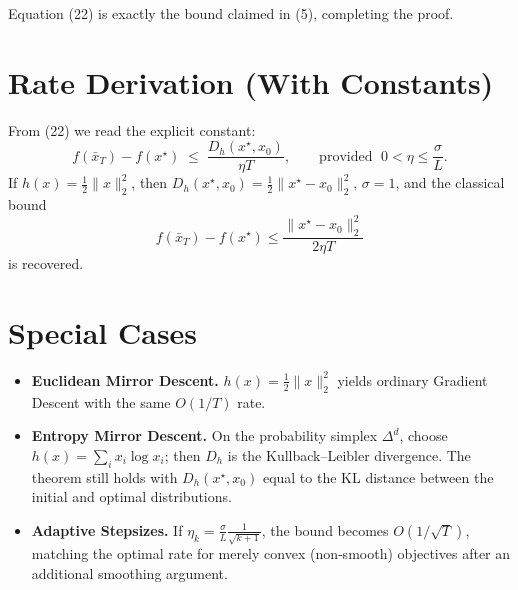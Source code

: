 \documentclass{article}
\begin{document}
Equation (22) is exactly the bound claimed in (5), completing the proof. \hfill\qedsymbol

\section*{Rate Derivation (With Constants)}
From (22) we read the explicit constant:
\[
\boxed{
\displaystyle
f(\bar x_{T})-f(x^{\star})\;\le\;
\frac{D_{h}(x^{\star},x_{0})}{\eta T},
\qquad
\text{provided }\;0<\eta\le\frac{\sigma}{L}.
}
\]
If $h(x)=\tfrac12\|x\|_{2}^{2}$, then $D_{h}(x^{\star},x_{0})=\tfrac12\|x^{\star}-x_{0}\|_{2}^{2}$, $\sigma=1$, and the classical bound
\[
f(\bar x_{T})-f(x^{\star})\le \frac{\|x^{\star}-x_{0}\|_{2}^{2}}{2\eta T}
\]
is recovered.

\section*{Special Cases}
\begin{itemize}
\item \textbf{Euclidean Mirror Descent.} $h(x)=\frac12\|x\|_{2}^{2}$ yields ordinary Gradient Descent with the same $O(1/T)$ rate.
\item \textbf{Entropy Mirror Descent.} On the probability simplex $\Delta^{d}$, choose $h(x)=\sum_{i}x_{i}\log x_{i}$; then $D_{h}$ is the Kullback–Leibler divergence. The theorem still holds with $D_{h}(x^{\star},x_{0})$ equal to the KL distance between the initial and optimal distributions.
\item \textbf{Adaptive Stepsizes.} If $\eta_{k}=\frac{\sigma}{L}\frac{1}{\sqrt{k+1}}$, the bound becomes $O(1/\sqrt{T})$, matching the optimal rate for merely convex (non‑smooth) objectives after an additional smoothing argument.
\end{itemize}
\end{document}
